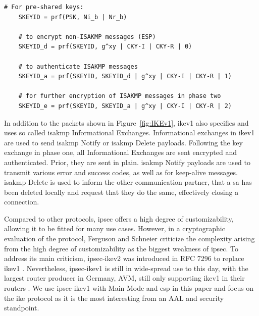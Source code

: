 \begin{lstlisting}[float=ht, caption=IKE Keying, label=lst:keying]
	# For pre-shared keys: 
	SKEYID = prf(PSK, Ni_b | Nr_b)
	
	# to encrypt non-ISAKMP messages (ESP)
	SKEYID_d = prf(SKEYID, g^xy | CKY-I | CKY-R | 0)
	
	# to authenticate ISAKMP messages
	SKEYID_a = prf(SKEYID, SKEYID_d | g^xy | CKY-I | CKY-R | 1)
	
	# for further encryption of ISAKMP messages in phase two
	SKEYID_e = prf(SKEYID, SKEYID_a | g^xy | CKY-I | CKY-R | 2)
\end{lstlisting}

In addition to the packets shown in Figure~\ref{fig:IKEv1}, \ac{ike}v1 also specifies and uses so called \ac{isakmp} Informational Exchanges. Informational exchanges in \ac{ike}v1 are used to send \ac{isakmp} Notify or \ac{isakmp} Delete payloads. Following the key exchange in phase one, all Informational Exchanges are sent encrypted and authenticated. Prior, they are sent in plain. \ac{isakmp} Notify payloads are used to transmit various error and success codes, as well as for keep-alive messages. \ac{isakmp} Delete is used to inform the other communication partner, that a \ac{sa} has been deleted locally and request that they do the same, effectively closing a connection. 

Compared to other protocols, \ac{ipsec} offers a high degree of customizability, allowing it to be fitted for many use cases. However, in a cryptographic evaluation of the protocol, Ferguson and Schneier \textcite{ferguson1999cryptographic} criticize the complexity arising from the high degree of customizability as the biggest weakness of \ac{ipsec}. To address its main criticism, \ac{ipsec}-\ac{ike}v2 was introduced in RFC 7296 to replace \ac{ike}v1 \parencite{kaufman2014internet}. Nevertheless, \ac{ipsec}-\ac{ike}v1 is still in wide-spread use to this day, with the largest router producer in Germany, AVM, still only supporting \ac{ike}v1 in their routers \parencite{avm2022}. We use \ac{ipsec}-\ac{ike}v1 with Main Mode and \ac{esp} in this paper and focus on the \ac{ike} protocol as it is the most interesting from an AAL and security standpoint. %

